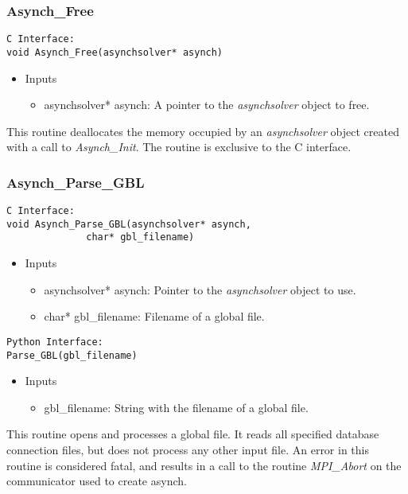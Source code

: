 \documentclass[12pt]{article}
\begin{document}
\subsubsection{Asynch\_Free} \label{sec: asynch_free}

\begin{lstlisting}[style=CStyle]
C Interface:
void Asynch_Free(asynchsolver* asynch)
\end{lstlisting}
\begin{itemize}
 \item Inputs
  \begin{itemize}
   \item asynchsolver* asynch: A pointer to the \emph{asynchsolver} object to free.
  \end{itemize}
\end{itemize}
This routine deallocates the memory occupied by an \emph{asynchsolver} object created with a call to \emph{Asynch\_Init}. The routine is exclusive to the C interface.



\subsubsection{Asynch\_Parse\_GBL} \label{sec: asynch_parse_gbl}

\begin{lstlisting}[style=CStyle]
C Interface: 
void Asynch_Parse_GBL(asynchsolver* asynch,
			  char* gbl_filename)
\end{lstlisting}
\begin{itemize}
 \item Inputs
  \begin{itemize}
   \item asynchsolver* asynch: Pointer to the \emph{asynchsolver} object to use.
   \item char* gbl\_filename: Filename of a global file.
  \end{itemize}
\end{itemize}
\begin{lstlisting}[style=PythonStyle]
Python Interface:
Parse_GBL(gbl_filename)
\end{lstlisting}
\begin{itemize}
 \item Inputs
  \begin{itemize}
   \item gbl\_filename: String with the filename of a global file.
  \end{itemize}
\end{itemize}
This routine opens and processes a global file. It reads all specified database connection files, but does not process any other input file. An error in this routine is considered fatal, and results in a call to the routine \emph{MPI\_Abort} on the communicator used to create asynch.
\end{document}
